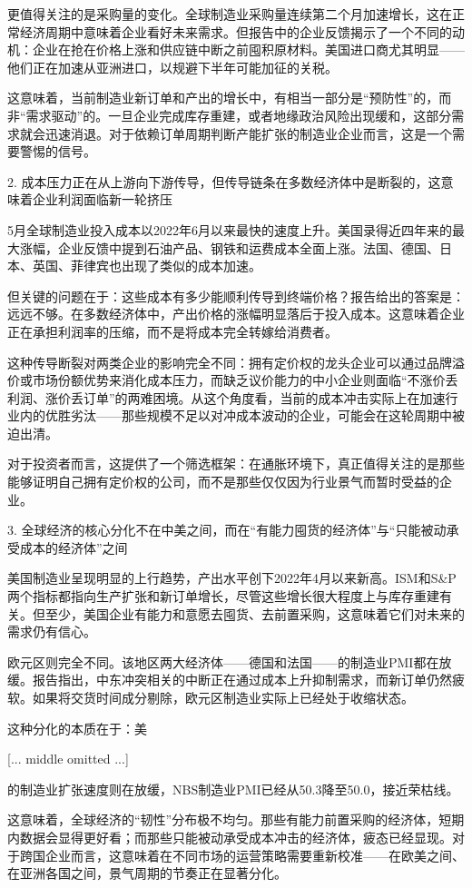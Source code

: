 \documentclass[11pt]{ctexart}
\begin{document}
更值得关注的是采购量的变化。全球制造业采购量连续第二个月加速增长，这在正常经济周期中意味着企业看好未来需求。但报告中的企业反馈揭示了一个不同的动机：企业在抢在价格上涨和供应链中断之前囤积原材料。美国进口商尤其明显——他们正在加速从亚洲进口，以规避下半年可能加征的关税。

这意味着，当前制造业新订单和产出的增长中，有相当一部分是“预防性”的，而非“需求驱动”的。一旦企业完成库存重建，或者地缘政治风险出现缓和，这部分需求就会迅速消退。对于依赖订单周期判断产能扩张的制造业企业而言，这是一个需要警惕的信号。

2. 成本压力正在从上游向下游传导，但传导链条在多数经济体中是断裂的，这意味着企业利润面临新一轮挤压

5月全球制造业投入成本以2022年6月以来最快的速度上升。美国录得近四年来的最大涨幅，企业反馈中提到石油产品、钢铁和运费成本全面上涨。法国、德国、日本、英国、菲律宾也出现了类似的成本加速。

但关键的问题在于：这些成本有多少能顺利传导到终端价格？报告给出的答案是：远远不够。在多数经济体中，产出价格的涨幅明显落后于投入成本。这意味着企业正在承担利润率的压缩，而不是将成本完全转嫁给消费者。

这种传导断裂对两类企业的影响完全不同：拥有定价权的龙头企业可以通过品牌溢价或市场份额优势来消化成本压力，而缺乏议价能力的中小企业则面临“不涨价丢利润、涨价丢订单”的两难困境。从这个角度看，当前的成本冲击实际上在加速行业内的优胜劣汰——那些规模不足以对冲成本波动的企业，可能会在这轮周期中被迫出清。

对于投资者而言，这提供了一个筛选框架：在通胀环境下，真正值得关注的是那些能够证明自己拥有定价权的公司，而不是那些仅仅因为行业景气而暂时受益的企业。

3. 全球经济的核心分化不在中美之间，而在“有能力囤货的经济体”与“只能被动承受成本的经济体”之间

美国制造业呈现明显的上行趋势，产出水平创下2022年4月以来新高。ISM和S\&P两个指标都指向生产扩张和新订单增长，尽管这些增长很大程度上与库存重建有关。但至少，美国企业有能力和意愿去囤货、去前置采购，这意味着它们对未来的需求仍有信心。

欧元区则完全不同。该地区两大经济体——德国和法国——的制造业PMI都在放缓。报告指出，中东冲突相关的中断正在通过成本上升抑制需求，而新订单仍然疲软。如果将交货时间成分剔除，欧元区制造业实际上已经处于收缩状态。

这种分化的本质在于：美

[... middle omitted ...]

的制造业扩张速度则在放缓，NBS制造业PMI已经从50.3降至50.0，接近荣枯线。

这意味着，全球经济的“韧性”分布极不均匀。那些有能力前置采购的经济体，短期内数据会显得更好看；而那些只能被动承受成本冲击的经济体，疲态已经显现。对于跨国企业而言，这意味着在不同市场的运营策略需要重新校准——在欧美之间、在亚洲各国之间，景气周期的节奏正在显著分化。
\end{document}
